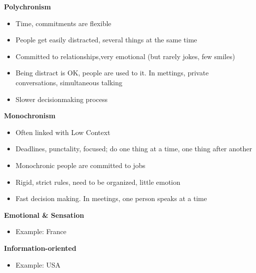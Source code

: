 \documentclass[11pt,a4paper,oneside,french,svgnames]{report}
\begin{document}
\begin{center}
\begin{minipage}[t]{.49\textwidth}
\centering\textbf{Polychronism}\\
  \begin{itemize}
    \item Time, commitments are flexible
    \item People get easily distracted, several things at the same time
    \item Committed to relationships,very emotional (but rarely jokes, few smiles)
    \item Being distract is OK, people are used to it. In mettings, private conversations, simultaneous talking
    \item Slower decisionmaking process
  \end{itemize}
\end{minipage}
\begin{minipage}[t]{.49\textwidth}
\centering\textbf{Monochronism}\\
  \begin{itemize}
    \item Often linked with Low Context
    \item Deadlines, punctality, focused; do one thing at a time, one thing after another
    \item Monochronic people are committed to jobs
    \item Rigid, strict rules, need to be organized, little emotion
    \item Fast decision making. In meetings, one person speaks at a time
  \end{itemize}
\end{minipage}

\begin{minipage}[t]{.49\textwidth}
\centering\textbf{Emotional \& Sensation}\\
  \begin{itemize}
    \item Example: France
  \end{itemize}
\end{minipage}
\begin{minipage}[t]{.49\textwidth}
\centering\textbf{Information-oriented}\\
  \begin{itemize}
    \item Example: USA
  \end{itemize}
\end{minipage}


\end{center}
\end{document}
